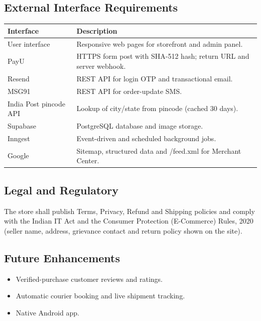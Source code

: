 \documentclass[11pt,a4paper]{article}
\begin{document}
\subsection{External Interface Requirements}
\begin{tabularx}{\linewidth}{@{}l X@{}}
\toprule
\textbf{Interface} & \textbf{Description} \\
\midrule
User interface & Responsive web pages for storefront and admin panel. \\
PayU & HTTPS form post with SHA-512 hash; return URL and server webhook. \\
Resend & REST API for login OTP and transactional email. \\
MSG91 & REST API for order-update SMS. \\
India Post pincode API & Lookup of city/state from pincode (cached 30 days). \\
Supabase & PostgreSQL database and image storage. \\
Inngest & Event-driven and scheduled background jobs. \\
Google & Sitemap, structured data and /feed.xml for Merchant Center. \\
\bottomrule
\end{tabularx}

\subsection{Legal and Regulatory}
The store shall publish Terms, Privacy, Refund and Shipping policies and comply with
the Indian IT Act and the Consumer Protection (E-Commerce) Rules, 2020 (seller name,
address, grievance contact and return policy shown on the site).

\subsection{Future Enhancements}
\begin{itemize}
  \item Verified-purchase customer reviews and ratings.
  \item Automatic courier booking and live shipment tracking.
  \item Native Android app.
\end{itemize}
\end{document}
